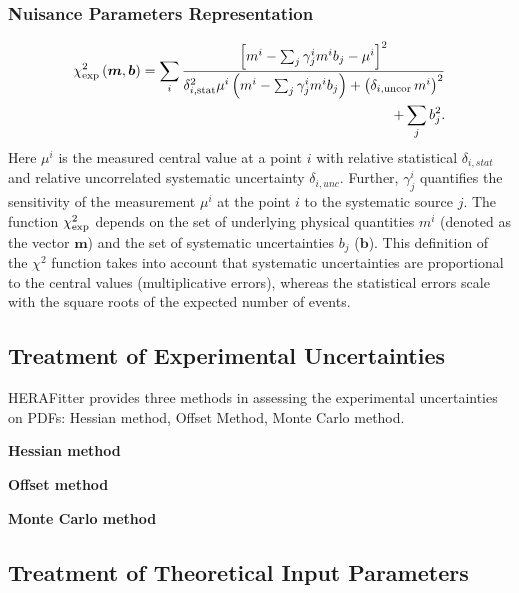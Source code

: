 \subsubsection{Nuisance Parameters Representation}

%
\begin{align} 
    \chi^2_{\rm exp}\left(\boldsymbol{m},\boldsymbol{b}\right) =  
 \sum_i \frac{\left[m^i - \sum_j \gamma^i_j m^i b_j  - {\mu^i} \right]^2}
{ \textstyle \delta^2_{i,{\rm stat}}\mu^i \left(m^i -  \sum_j \gamma^i_j m^i b_j\right)
  + \left(\delta_{i,{\rm uncor}}\,  m^i\right)^2} \nonumber \\
  + \sum_j b^2_j.
\label{eq:aven}
\end{align}
%
Here ${\mu^i}$ is the  measured central value  at a point $i$ 
with  relative statistical $\delta_{i,stat}$ 
and relative uncorrelated systematic uncertainty $\delta_{i,unc}$.
Further, 
$\gamma^i_j$ 
quantifies the sensitivity of the
measurement ${\mu^i}$ at the point $i$ to the systematic source $j$. 
The function $\chi^2_{\rm exp}$ depends on the set of
underlying physical quantities $m^i$ 
(denoted as the vector $\boldsymbol{m}$) and 
 the set of systematic uncertainties $b_j$ ($\boldsymbol{b}$).
This definition of the $\chi^2$ function takes into account that
systematic uncertainties are proportional to the central values 
(multiplicative errors), whereas the statistical errors scale 
with the square roots of the expected number of events. 


\subsection{Treatment of Experimental Uncertainties}

HERAFitter provides three methods in assessing the experimental uncertainties on PDFs: Hessian method, Offset Method, Monte Carlo method.
\begin{description}
\item \bf{Hessian method}
\item \bf{Offset  method}
\item \bf{Monte Carlo method}
\end{description}


\subsection{Treatment of Theoretical Input Parameters}

